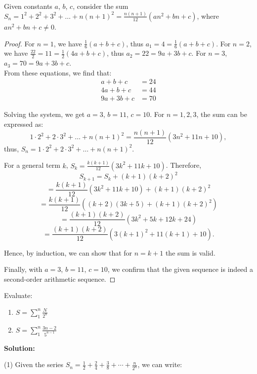 \begin{exercise}
    Given constants $a$, $b$, $c$, consider the sum $S_n = 1^2 + 2^2 + 3^2 + \ldots + n(n+1)^2 = \frac{n(n+1)}{12}(an^2 + bn + c)$, where $an^2 + bn + c \neq 0$.
\end{exercise}
\begin{proof}
    For $n=1$, we have $\frac{1}{6}(a+b+c)$, thus $a_1 = 4 = \frac{1}{6}(a+b+c)$.
For $n=2$, we have $\frac{22}{2} = 11 = \frac{1}{2}(4a+b+c)$, thus $a_2 = 22 = 9a + 3b + c$.
For $n=3$, $a_3 = 70 = 9a + 3b + c$.\\

From these equations, we find that:
\begin{align*}
    a + b + c &= 24 \\
    4a + b + c &= 44 \\
    9a + 3b + c &= 70
\end{align*}

Solving the system, we get $a=3$, $b=11$, $c=10$.
For \(n = 1, 2, 3\), the sum can be expressed as:
\[
1 \cdot 2^2 + 2 \cdot 3^2 + \ldots + n(n+1)^2 = \frac{n(n+1)}{12}(3n^2 + 11n + 10),
\]
thus, \(S_n = 1 \cdot 2^2 + 2 \cdot 3^2 + \ldots + n(n+1)^2\).

For a general term \(k\), \(S_k = \frac{k(k+1)}{12}(3k^2 + 11k + 10)\). Therefore,
\[
S_{k+1} = S_k + (k+1)(k+2)^2
\]
\[
= \frac{k(k+1)}{12}(3k^2 + 11k + 10) + (k+1)(k+2)^2
\]
\[
= \frac{k(k+1)}{12}((k+2)(3k+5) + (k+1)(k+2)^2)
\]
\[
= \frac{(k+1)(k+2)}{12}(3k^2 + 5k + 12k + 24)
\]
\[
= \frac{(k+1)(k+2)}{12}(3(k+1)^2 + 11(k+1) + 10).
\]

Hence, by induction, we can show that for \(n = k+1\) the sum is valid.

Finally, with \(a = 3\), \(b = 11\), \(c = 10\), we confirm that the given sequence is indeed a second-order arithmetic sequence.
\end{proof}

\begin{exercise}
    Evaluate:
    \begin{enumerate}
        \item $S = \sum_{1}^{n} \frac{N}{2^n}$
        \\
        \item $S = \sum_{1}^{n} \frac{3n-2}{5^{n-1}}$  
    \end{enumerate}
\end{exercise}

\textbf{Solution:}

(1) Given the series \( S_n = \frac{1}{2} + \frac{2}{4} + \frac{3}{8} + \cdots + \frac{n}{2^n} \), we can write:

